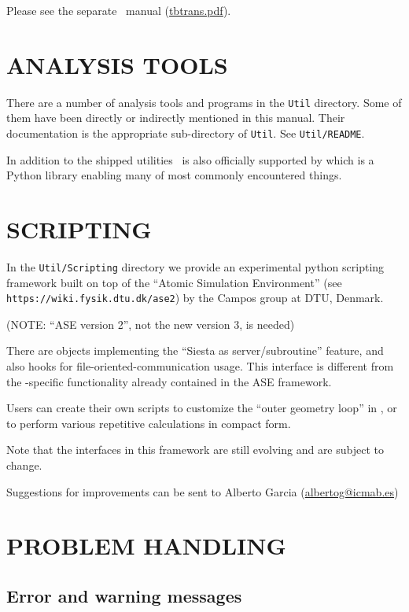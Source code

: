 Please see the separate \tbtrans\ manual
(\href{run:tbtrans.pdf}{tbtrans.pdf}). 


\section{ANALYSIS TOOLS}

There are a number of analysis tools and programs in the \texttt{Util}
directory. Some of them have been directly or indirectly mentioned in
this manual. Their documentation is the appropriate sub-directory of
\texttt{Util}. See \texttt{Util/README}.

In addition to the shipped utilities \siesta\ is also officially
supported by \sisl\cite{sisl} which is a Python library enabling many
of most commonly encountered things.

\section{SCRIPTING}

In the \texttt{Util/Scripting} directory we provide an experimental
python scripting framework built on top of the ``Atomic Simulation
Environment'' (see \texttt{https://wiki.fysik.dtu.dk/ase2}) by the Campos
group at DTU, Denmark.

(NOTE: ``ASE version 2'', not the new version 3, is needed)

There are objects implementing the ``Siesta as server/subroutine'' feature, and
also hooks for file-oriented-communication usage. This interface is
different from the \siesta-specific functionality already
contained in the ASE framework.

Users can create their own scripts to customize the ``outer geometry loop''
in \siesta, or to perform various repetitive calculations in compact form.

Note that the interfaces in this framework are still evolving and are
subject to change.

Suggestions for improvements can be sent to Alberto Garcia
(\href{mailto:albertog@icmab.es}{albertog@icmab.es})

\section{PROBLEM HANDLING}

\subsection{Error and warning messages}

